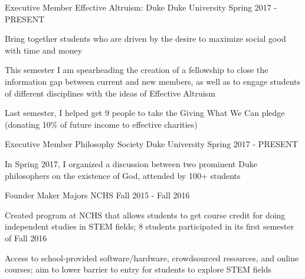 


\begin{cventries}


\cventry
{Executive Member} %
{Effective Altruism: Duke} %
{Duke University} %
{Spring 2017 - PRESENT} %
{ %
\begin{cvitems}
\item {Bring together students who are driven by the desire to maximize social good with time and money}
\item {This semester I am spearheading the creation of a fellowship to close the information gap between current and new members, as well as to engage students of different disciplines with the ideas of Effective Altruism}
\item {Last semester, I helped get 9 people to take the Giving What We Can pledge (donating 10\% of future income to effective charities)}
\end{cvitems}
}


\cventry
{Executive Member} %
{Philosophy Society} %
{Duke University} %
{Spring 2017 - PRESENT} %
{ %
\begin{cvitems}
\item {In Spring 2017, I organized a discussion between two prominent Duke philosophers on the existence of God, attended by 100+ students}
\end{cvitems}
}


\cventry
{Founder} %
{Maker Majors} %
{NCHS} %
{Fall 2015 - Fall 2016} %
{ %
\begin{cvitems}
\item {Created program at NCHS that allows students to get course credit for doing independent studies in STEM fields; 8 students participated in its first semester of Fall 2016}
\item {Access to school-provided software/hardware, crowdsourced resources, and online courses; aim to lower barrier to entry for students to explore STEM fields}
\end{cvitems} 
}


\end{cventries}
